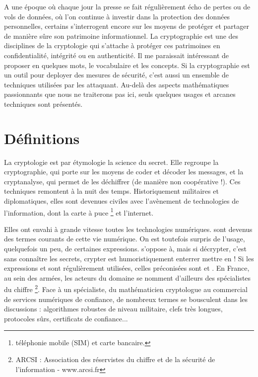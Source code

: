 

A une époque où chaque jour la presse se fait régulièrement écho de pertes ou de vols de données, où l'on continue à investir dans la  protection des données personnelles, certains s'interrogent encore sur les moyens de protéger et partager de manière sûre son patrimoine informationnel. La cryptographie est une des disciplines de la cryptologie qui s'attache à protéger ces patrimoines en confidentialité, intégrité ou en authenticité. Il me paraissait intéressant de proposer en quelques mots,  le vocabulaire et les concepts. Si la cryptographie est un outil pour deployer des mesures de sécurité, c'est aussi un ensemble de techniques utilisées par les attaquant.  Au-delà des aspects mathématiques passionnants que nous ne traiterons pas ici,  seuls quelques usages et arcanes techniques sont présentés.

\section{Définitions}

 La cryptologie est par étymologie la science du secret. Elle regroupe la cryptographie, qui porte sur les moyens de coder et décoder les messages, et la cryptanalyse, qui permet de les déchiffrer (de manière non coopérative !).
Ces techniques remontent à la nuit des temps. Historiquement militaires et diplomatiques, elles sont devenues civiles avec l'avènement de technologies de l'information, dont la carte à puce \footnote{téléphonie mobile (SIM) et carte bancaire. } et l'internet.

Elles ont envahi à grande vitesse toutes les technologies numériques. sont devenus des termes courants de cette vie numérique. On est toutefois surpris de l'usage, quelquefois un peu, de certaines expressions. s'oppose à, mais si décrypter, c'est sans connaître les secrets, crypter est humoristiquement enterrer  mettre en ! Si les expressions et sont régulièrement utilisées, celles préconisées sont  et . En France, au sein des armées, les acteurs du domaine se nomment d'ailleurs des spécialistes du chiffre \footnote{ARCSI : Association des réservistes du chiffre et de la sécurité de l'information - www.arcsi.fr}. Face à un spécialiste, du mathématicien cryptologue au commercial de services numériques de confiance, de nombreux termes se bousculent dans les discussions : algorithmes robustes de niveau militaire, clefs très longues, protocoles sûrs, certificats de confiance...

